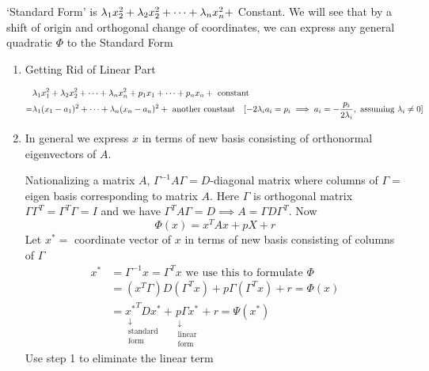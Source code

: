 `Standard Form' is $\lambda_1x_2^2+\lambda_2x_2^2+\cdots+\lambda_nx_n^2+$ Constant. We will see that by a shift of origin and orthogonal change of coordinates, we can express any general quadratic $\Phi$ to the Standard Form
\begin{enumerate}[label=\bfseries\tiny\protect\circled{\small\arabic*}]
	\item Getting Rid of Linear Part
	
	\begin{align*}
		& \lambda_1x_1^2+\lambda_2x_2^2+\cdots+\lambda_nx_n^2+p_1x_1+\cdots+p_nx_n+\text{ constant}\\
		= & \lambda_1(x_1-a_1)^2+\cdots+\lambda_n(x_n-a_n)^2+\text{ another constant} \quad [-2\lambda_ia_i=p_i\implies a_i=-\frac{p_i}{2\lambda_i},\text{ assuming }\lambda_i\neq 0]
	\end{align*}
\item In general we express $x$ in terms of new basis consisting of orthonormal eigenvectors of $A$. 

Nationalizing a matrix $A$, $\Gamma^{-1}A\Gamma=D $-diagonal matrix where columns of $\Gamma=$ eigen basis corresponding to matrix $A$. Here $\Gamma$ is orthogonal matrix $\Gamma\Gamma^T=\Gamma^T\Gamma=I$ and we have $\Gamma^TA\Gamma=D\implies A=\Gamma D\Gamma^T$. Now $$\Phi(x)=x^TAx+pX+r$$Let $x^*=$ coordinate vector of $x$ in terms of  new basis consisting of columns of $\Gamma$\begin{align*}
	x^* & = \Gamma^{-1}x=\Gamma^T x \text{ we use this to formulate }\Phi\\
	& = (x^T\Gamma)D(\Gamma^Tx)+p\Gamma(\Gamma^Tx)+r=\Phi(x)\\
	& = \underset{  \substack{  \downarrow \\ \text{standard} \\ \text{form}  }  }{{x^*}^TDx^*}+\underset{\substack{\downarrow \\ \text{linear} \\ \text{form}  }  }{p\Gamma x^*}+r=\Psi(x^*)
\end{align*} Use step 1 to eliminate the linear term
\end{enumerate}

